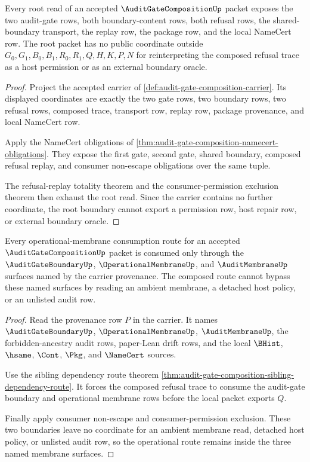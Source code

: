 \begin{theorem}
\label{thm:audit-gate-composition-root-boundary-totality}
Every root read of an accepted $\AuditGateCompositionUp$ packet exposes the
two audit-gate rows, both boundary-content rows, both refusal rows, the
shared-boundary transport, the replay row, the package row, and the local
NameCert row. The root packet has no public coordinate outside
$G_0,G_1,B_0,B_1,R_0,R_1,Q,H,K,P,N$ for reinterpreting the composed refusal
trace as a host permission or as an external boundary oracle.
\end{theorem}
\begin{proof}
Project the accepted carrier of
\autoref{def:audit-gate-composition-carrier}. Its displayed coordinates are
exactly the two gate rows, two boundary rows, two refusal rows, composed
trace, transport row, replay row, package provenance, and local NameCert
row.

Apply the NameCert obligations of
\autoref{thm:audit-gate-composition-namecert-obligations}. They expose the
first gate, second gate, shared boundary, composed refusal replay, and
consumer non-escape obligations over the same tuple.

The refusal-replay totality theorem and the consumer-permission exclusion
theorem then exhaust the root read. Since the carrier contains no further
coordinate, the root boundary cannot export a permission row, host repair
row, or external boundary oracle.
\end{proof}

\begin{theorem}
\label{thm:audit-gate-composition-operational-membrane-route}
Every operational-membrane consumption route for an accepted
$\AuditGateCompositionUp$ packet is consumed only through the
$\AuditGateBoundaryUp$, $\OperationalMembraneUp$, and $\AuditMembraneUp$
surfaces named by the carrier provenance. The composed route cannot bypass
these named surfaces by reading an ambient membrane, a detached host policy,
or an unlisted audit row.
\end{theorem}
\begin{proof}
Read the provenance row $P$ in the carrier. It names
$\AuditGateBoundaryUp$, $\OperationalMembraneUp$, $\AuditMembraneUp$, the
forbidden-ancestry audit rows, paper-Lean drift rows, and the local
$\BHist$, $\hsame$, $\Cont$, $\Pkg$, and $\NameCert$ sources.

Use the sibling dependency route theorem
\autoref{thm:audit-gate-composition-sibling-dependency-route}. It forces the
composed refusal trace to consume the audit-gate boundary and operational
membrane rows before the local packet exports $Q$.

Finally apply consumer non-escape and consumer-permission exclusion. These
two boundaries leave no coordinate for an ambient membrane read, detached
host policy, or unlisted audit row, so the operational route remains inside
the three named membrane surfaces.
\end{proof}

